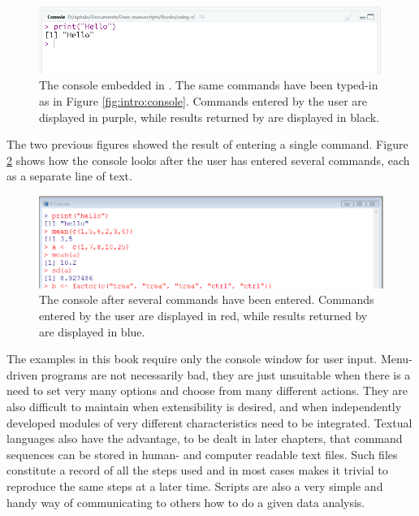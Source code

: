 \documentclass[krantz2]{krantz}\usepackage{knitr}%
\begin{document}
\begin{figure}
  \centering
  \includegraphics[width=\linewidth]{figures/r-console-rstudio}
  \caption[The R console]{The \Rpgrm console embedded in \RStudio. The same commands have been typed-in as in Figure \ref{fig:intro:console}. Commands entered by the user are displayed in purple, while results returned by \Rpgrm are displayed in black.}\label{fig:intro:console:rstudio}
\end{figure}

The two previous figures showed the result of entering a single command. Figure \ref{fig:intro:console:capture} shows how the console looks after the user has entered several commands, each as a separate line of text.

\begin{figure}
  \centering
  \includegraphics[width=\linewidth]{figures/r-console-capture}
  \caption[The R console]{The \Rpgrm console after several commands have been entered. Commands entered by the user are displayed in red, while results returned by \Rpgrm are displayed in blue.}\label{fig:intro:console:capture}
\end{figure}

The examples in this book require only the console window for user input. Menu-driven programs are not necessarily bad, they are just unsuitable when there is a need to set very many options and choose from many different actions. They are also difficult to maintain when extensibility is desired, and when independently developed modules of very different characteristics need to be integrated. Textual languages also have the advantage, to be dealt in later chapters, that command sequences can be stored in human- and computer readable text files. Such files constitute a record of all the steps used and in most cases makes it trivial to reproduce the same steps at a later time. Scripts are also a very simple and handy way of communicating to others how to do a given data analysis.
\end{document}
